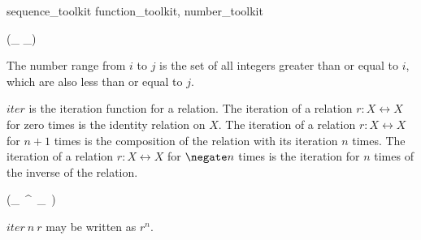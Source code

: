 \documentclass[draft,a4paper,10pt,wd]{isov2}
\begin{document}

\begin{zsection}
\SECTION sequence\_toolkit \parents function\_toolkit, number\_toolkit
\end{zsection}


\begin{zed}
 \leftassoc (\_ \upto \_)
\end{zed}


The number range from $i$ to $j$ is the set of all integers
greater than or equal to $i$,
which are also less than or equal to $j$.



$iter$ is the iteration function for a relation.
The iteration of a relation $r : X \rel X$ for zero times is the
identity relation on $X$.
The iteration of a relation $r : X \rel X$ for $n+1$ times is the
composition of the relation with its iteration $n$ times.
The iteration of a relation $r : X \rel X$ for $\negate n$ times is the
iteration for $n$ times of the inverse of the relation.

\begin{zed}
\function (\_~^{~\_~})
\end{zed}


$iter~n~r$ may be written as $r ^{ n }$.

\end{document}
